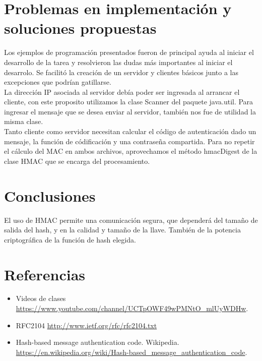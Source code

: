 \documentclass[letter, 10pt]{article}
\begin{document}
\section{Problemas en implementación y soluciones propuestas}
Los ejemplos de programación presentados fueron de principal ayuda al iniciar el desarrollo de la tarea
y resolvieron las dudas más importantes al iniciar el desarrolo. Se facilitó la creación de un servidor
y clientes básicos junto a las excepciones que podrían gatillarse. \\
La dirección IP asociada al servidor debía poder ser ingresada al arrancar el cliente, con este proposito utilizamos
la clase Scanner del paquete java.util. Para ingresar el mensaje que se desea enviar al servidor, también nos fue
de utilidad la misma clase.\\
Tanto cliente como servidor necesitan calcular el código de autenticación dado un mensaje, la función de códificación
y una contraseña compartida. Para no repetir el cálculo del MAC en ambos archivos, aprovechamos el método hmacDigest
de la clase HMAC que se encarga del procesamiento.

\newpage
\section{Conclusiones}
El uso de HMAC permite una comunicación segura, que dependerá del tamaño de salida del hash, y en la calidad
y tamaño de la llave. También de la potencia criptográfica de la función de hash elegida.


\section{Referencias}
\begin{itemize}
 \item Videos de clases \url{https://www.youtube.com/channel/UCTpOWF49wPMNtO_mlUyWDHw}.
 \item RFC2104 \url{http://www.ietf.org/rfc/rfc2104.txt}
 \item Hash-based message authentication code. Wikipedia. \url{https://en.wikipedia.org/wiki/Hash-based_message_authentication_code}.
\end{itemize}
\end{document}

